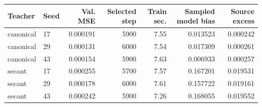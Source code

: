 \begin{center}\small
\begin{tabular}{@{}llrrrrr@{}}
\toprule
Teacher & Seed & Val. MSE & Selected step & Train sec. & Sampled model bias & Source excess\\
\midrule
canonical & 17 & 0.000191 & 5900 & 7.55 & 0.013523 & 0.000242\\
canonical & 29 & 0.000131 & 6000 & 7.54 & 0.017309 & 0.000261\\
canonical & 43 & 0.000154 & 5900 & 7.63 & 0.006933 & 0.000257\\
secant & 17 & 0.000255 & 5700 & 7.57 & 0.167201 & 0.019531\\
secant & 29 & 0.000178 & 6000 & 7.61 & 0.157722 & 0.019161\\
secant & 43 & 0.000242 & 5900 & 7.26 & 0.168055 & 0.019552\\
\bottomrule
\end{tabular}\end{center}
